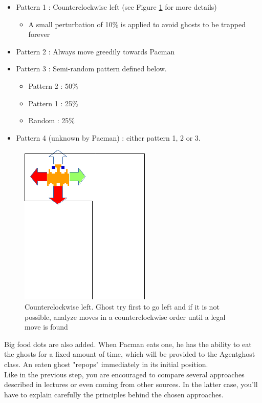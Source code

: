 \documentclass[12pt,a4paper,BCOR12mm, headexclude, footexclude, twoside, openright]{scrartcl}
\numberwithin{equation}{section} %
\numberwithin{figure}{section} %
\numberwithin{table}{section} %
\begin{document}
\begin{itemize}
	\item Pattern 1 : Counterclockwise left (see Figure \ref{counterclockwise} for more details)
    	\begin{itemize}
        	\item A small perturbation of 10\% is applied to avoid ghosts to be trapped forever
        \end{itemize}
    \item Pattern 2 : Always move greedily towards Pacman
    \item Pattern 3 : Semi-random pattern defined below.
    \begin{itemize}
    	\item Pattern 2 : 50\% 
        \item Pattern 1 : 25\%
        \item Random : 25\%
    \end{itemize}
    \item Pattern 4 (unknown by Pacman) : either pattern 1, 2 or 3.
\end{itemize}

\begin{figure}
	\label{counterclockwise}
	\begin{center}
	
	\includegraphics[scale=1]{ghostclockwiseleft.png}
    \caption{Counterclockwise left. Ghost try first to go left and if it is not possible, analyze moves in a counterclockwise order until a legal move is found}
    \end{center}
\end{figure}



Big food dots are also added. When Pacman eats one, he has the ability to eat the ghosts for a fixed amount of time, which will be provided to the Agentghost class. An eaten ghost "repops" immediately in its initial position.\\

Like in the previous step, you are encouraged to compare several approaches described in lectures or even coming from other sources. In the latter case, you'll have to explain carefully the principles behind the chosen approaches.
\end{document}
